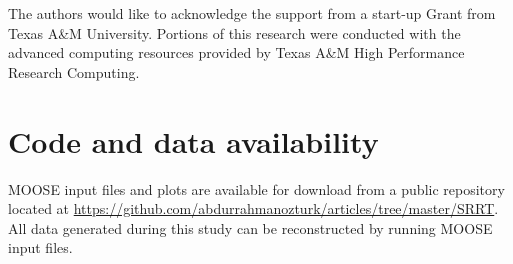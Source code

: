 \documentclass[utf8]{frontiersSCNS} %
\begin{document}
The authors would like to acknowledge the support from a start-up Grant from Texas A&M University. Portions of this research were conducted with the advanced computing resources provided by Texas A&M High Performance Research Computing.         

\section*{Code and data availability}

MOOSE input files and plots are available for download from a public repository located at
\href{https://github.com/abdurrahmanozturk/articles/tree/master/SRRT}{https://github.com/abdurrahmanozturk/articles/tree/master/SRRT}. All data generated during this study can be reconstructed by running MOOSE input files.
\clearpage


\end{document}
